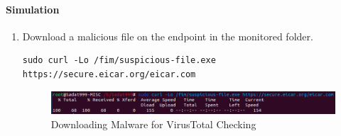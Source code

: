 \paragraph{Simulation}
\begin{enumerate}
    \item Download a malicious file on the endpoint in the monitored folder.
    \begin{verbatim}
sudo curl -Lo /fim/suspicious-file.exe https://secure.eicar.org/eicar.com
    \end{verbatim}
    \begin{figure}[H]
        \centering
        \includegraphics[width=\textwidth]{images/malware-detection/virustotal/2.png}
        \caption{Downloading Malware for VirusTotal Checking}
        \label{fig:virustotal-malware}
    \end{figure}
\end{enumerate}

